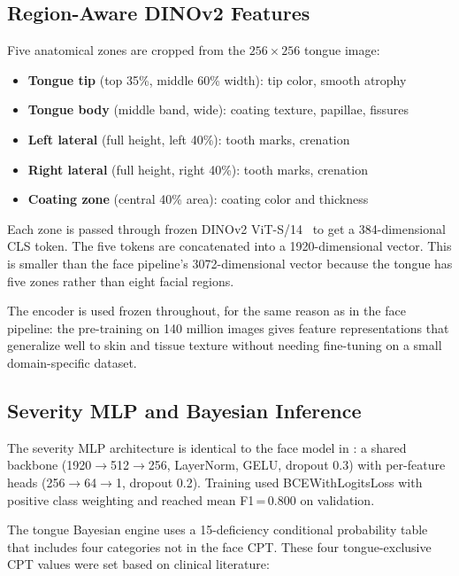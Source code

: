 \documentclass[journal]{IEEEtran}
\begin{document}
\subsection{Region-Aware DINOv2 Features}

Five anatomical zones are cropped from the $256 \times 256$ tongue image:

\begin{itemize}
  \item \textbf{Tongue tip} (top 35\%, middle 60\% width): tip color, smooth atrophy
  \item \textbf{Tongue body} (middle band, wide): coating texture, papillae, fissures
  \item \textbf{Left lateral} (full height, left 40\%): tooth marks, crenation
  \item \textbf{Right lateral} (full height, right 40\%): tooth marks, crenation
  \item \textbf{Coating zone} (central 40\% area): coating color and thickness
\end{itemize}

Each zone is passed through frozen DINOv2 ViT-S/14~\cite{oquab2024} to get a
384-dimensional CLS token. The five tokens are concatenated into a 1920-dimensional
vector. This is smaller than the face pipeline's 3072-dimensional vector because
the tongue has five zones rather than eight facial regions.

The encoder is used frozen throughout, for the same reason as in the face pipeline:
the pre-training on 140 million images gives feature representations that
generalize well to skin and tissue texture without needing fine-tuning on a
small domain-specific dataset.

\subsection{Severity MLP and Bayesian Inference}

The severity MLP architecture is identical to the face model in
\cite{muhammad2026facefuel}: a shared backbone (1920$\to$512$\to$256, LayerNorm,
GELU, dropout 0.3) with per-feature heads (256$\to$64$\to$1, dropout 0.2).
Training used BCEWithLogitsLoss with positive class weighting and reached mean
F1\,=\,0.800 on validation.

The tongue Bayesian engine uses a 15-deficiency conditional probability table
that includes four categories not in the face CPT. These four tongue-exclusive
CPT values were set based on clinical literature:
\end{document}
